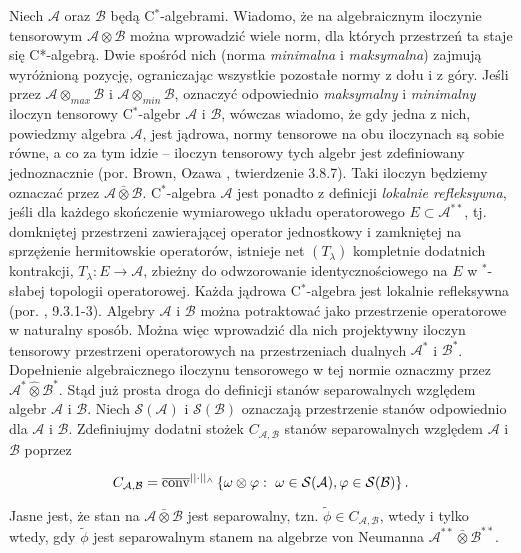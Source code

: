 Niech  $\mathcal{A}$ oraz $\mathcal{B}$ będą C$^{*}$-algebrami.
Wiadomo, że na algebraicznym iloczynie tensorowym
$\mathcal{A} \otimes \mathcal{B}$ można wprowadzić wiele norm,
dla których przestrzeń ta staje się C*-algebrą.
Dwie spośród nich (norma \emph{minimalna} i \emph{maksymalna})
zajmują wyróżnioną pozycję, ograniczając wszystkie pozostałe normy z dołu i z góry.
Jeśli przez $\mathcal{A} \otimes_{max} \mathcal{B}$
i $\mathcal{A} \otimes_{min} \mathcal{B}$,
oznaczyć odpowiednio
\emph{maksymalny} i \emph{minimalny}
iloczyn tensorowy C$^{*}$-algebr $\mathcal{A}$ i $\mathcal{B}$,
wówczas wiadomo, że gdy jedna z nich, powiedzmy algebra $\mathcal{A}$,
jest jądrowa, normy tensorowe na obu iloczynach są sobie równe,
a co za tym idzie -- iloczyn tensorowy tych algebr jest zdefiniowany
jednoznacznie (por. Brown, Ozawa \cite{Brown2008}, twierdzenie 3.8.7).
Taki iloczyn będziemy oznaczać przez
$\mathcal{A} \bar{\otimes} \mathcal{B}$.
C$^{*}$-algebra $\mathcal{A}$ jest ponadto z definicji \emph{lokalnie refleksywna},
jeśli dla każdego skończenie wymiarowego układu operatorowego
$E \subset \mathcal{A}^{**}$,
tj. domkniętej przestrzeni zawierającej operator jednostkowy i zamkniętej
na sprzężenie hermitowskie operatorów,
istnieje net $(T_{\lambda})$ kompletnie dodatnich kontrakcji,
$T_{\lambda}: E \rightarrow \mathcal{A}$,
zbieżny do odwzorowanie identycznościowego na $E$
w $^{*}$-słabej topologii operatorowej.
Każda jądrowa C$^{*}$-algebra jest lokalnie refleksywna
(por. \cite{Brown2008}, 9.3.1-3).
Algebry $\mathcal{A}$ i $\mathcal{B}$
można potraktować jako przestrzenie operatorowe w naturalny sposób.
Można więc wprowadzić dla nich projektywny iloczyn tensorowy
przestrzeni operatorowych na przestrzeniach dualnych
$\mathcal{A}^{*}$ i $\mathcal{B}^{*}$.
Dopełnienie algebraicznego iloczynu tensorowego w tej normie oznaczmy przez
$\mathcal{A}^{*} \hat{\otimes} \mathcal{B}^{*}$.
Stąd już prosta droga do definicji stanów separowalnych względem
algebr $\mathcal{A}$ i  $\mathcal{B}$.
Niech
$\mathcal{S}(\mathcal{A})$ i $\mathcal{S}(\mathcal{B})$
oznaczają przestrzenie stanów odpowiednio dla $\mathcal{A}$ i $\mathcal{B}$.
Zdefiniujmy dodatni stożek $C_{\mathcal{A},\mathcal{B}}$
stanów separowalnych względem  $\mathcal{A}$ i $\mathcal{B}$ poprzez
\begin{linenomath*}
 \begin{equation}
C_{\mathcal{A},\mathcal{B}} =
\overline{{\rm conv}}^{||\cdot||_{\wedge}}
\left \{\omega \otimes \varphi: \, \,\omega \in \mathcal{S}(\mathcal{A}),
\varphi \in \mathcal{S}(\mathcal{B})\right \}.
 \end{equation}
\end{linenomath*}
Jasne jest, że stan na $\mathcal{A} \bar{\otimes} \mathcal{B}$ jest separowalny,
tzn. $\tilde{\phi} \in C_{\mathcal{A}, \mathcal{B}}$,
wtedy i tylko wtedy, gdy $\tilde{\phi}$ jest separowalnym stanem na
algebrze von Neumanna $\mathcal{A}^{**} \bar{\otimes} \mathcal{B}^{**}$.

